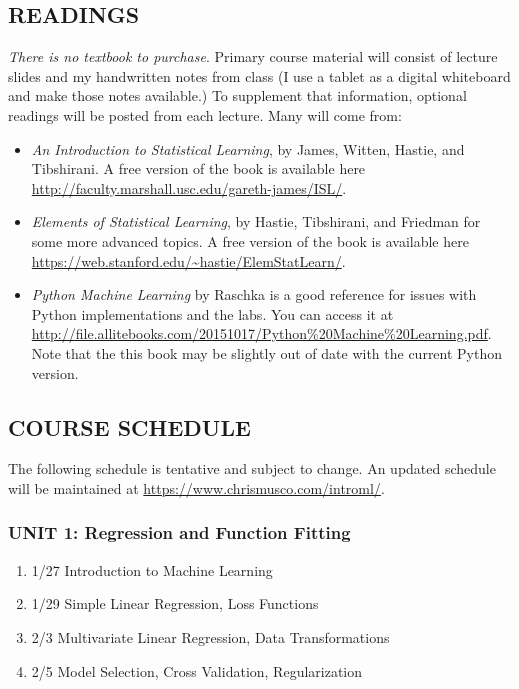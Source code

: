 \documentclass[10pt]{article}
\begin{document}
\subsection{READINGS}
\textit{There is no textbook to purchase}. Primary course material will consist of lecture slides and my handwritten notes from class (I use a tablet as a digital whiteboard and make those notes available.) To supplement that information, optional readings will be posted from each lecture. Many will come from:

\begin{itemize}
	\item \textit{An Introduction to Statistical Learning}, by James, Witten, Hastie, and Tibshirani. A free version of the book is available here \url{http://faculty.marshall.usc.edu/gareth-james/ISL/}.
	\item \textit{Elements of Statistical Learning}, by Hastie, Tibshirani, and Friedman for some more advanced topics. A free version of the book is available here \url{https://web.stanford.edu/~hastie/ElemStatLearn/}.
	\item \textit{Python Machine Learning} by Raschka is a good reference for issues with Python implementations and the labs. You can access it at \url{http://file.allitebooks.com/20151017/Python%20Machine%20Learning.pdf}. Note that the this book may be slightly out of date with the current  Python version. 
\end{itemize}

\subsection{COURSE SCHEDULE}
The following schedule is tentative and subject to change. An updated schedule will be maintained at  \url{https://www.chrismusco.com/introml/}. 
\subsubsection{UNIT 1: Regression and Function Fitting}
\begin{enumerate}\itemsep0em 
	\item 1/27 Introduction to Machine Learning
	\item 1/29 Simple Linear Regression, Loss Functions
	\item 2/3 Multivariate Linear Regression, Data Transformations
	\item 2/5 Model Selection, Cross Validation, Regularization
\end{enumerate}
\end{document}

